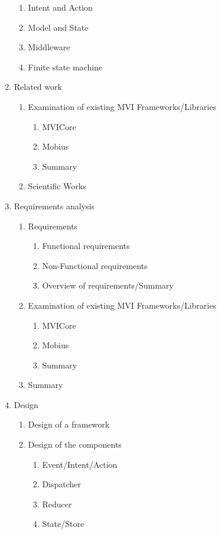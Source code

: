 \begin{enumerate}
\begin{enumerate}
			\item Intent and Action
			\item Model and State
			\item Middleware
			\item Finite state machine
		\end{enumerate}	
		\item Related work
		\begin{enumerate}
			\item Examination of existing  MVI Frameworks/Libraries
			\begin{enumerate}
				\item MVICore
				\item Mobius
				\item Summary
			\end{enumerate}
			\item Scientific Works	
		\end{enumerate}
	\item Requirements analysis
		\begin{enumerate}
			\item Requirements
		\begin{enumerate}
			\item Functional requirements
			\item Non-Functional requirements
			\item Overview of requirements/Summary
		\end{enumerate}
		\item Examination of existing  MVI Frameworks/Libraries
		\begin{enumerate}
			\item MVICore
			\item Mobius
			\item Summary
		\end{enumerate}
			\item Summary
		\end{enumerate}
	\item Design
	\begin{enumerate}
		\item Design of a framework
		\item Design of the components
		\begin{enumerate}
			\item Event/Intent/Action
			\item Dispatcher
			\item Reducer
			\item State/Store
		\end{enumerate}

\end{enumerate}
\end{enumerate}
